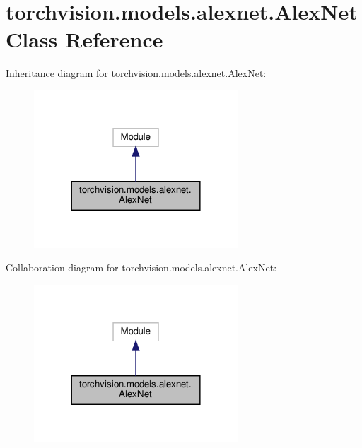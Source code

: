 \hypertarget{classtorchvision_1_1models_1_1alexnet_1_1AlexNet}{}\section{torchvision.\+models.\+alexnet.\+Alex\+Net Class Reference}
\label{classtorchvision_1_1models_1_1alexnet_1_1AlexNet}


Inheritance diagram for torchvision.\+models.\+alexnet.\+Alex\+Net\+:
\nopagebreak
\begin{figure}[H]
\begin{center}
\leavevmode
\includegraphics[width=216pt]{classtorchvision_1_1models_1_1alexnet_1_1AlexNet__inherit__graph}
\end{center}
\end{figure}


Collaboration diagram for torchvision.\+models.\+alexnet.\+Alex\+Net\+:
\nopagebreak
\begin{figure}[H]
\begin{center}
\leavevmode
\includegraphics[width=216pt]{classtorchvision_1_1models_1_1alexnet_1_1AlexNet__coll__graph}
\end{center}
\end{figure}
